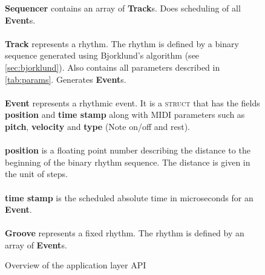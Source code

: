 \begin{figure}[H]
    \centering
    \begin{factbox}
        \textbf{Sequencer} contains an array of   \textbf{Track}s. Does scheduling of all \textbf{Event}s.
        \\\\
        \textbf{Track} represents a rhythm. The rhythm is defined by a binary sequence generated using Bjorklund's algorithm (see \cref{sec:bjorklund}). Also contains all parameters described in \cref{tab:params}. Generates \textbf{Event}s.
        \\\\
        \textbf{Event} represents a rhythmic event. It is a \textsc{struct} that has the fields \textbf{position} and \textbf{time stamp} along with MIDI parameters such as \textbf{pitch}, \textbf{velocity} and \textbf{type} (Note on/off and rest).
        \\\\
        \textbf{position} is a floating point number describing the distance to the beginning of the binary rhythm sequence. The distance is given in the unit of steps.
        \\\\
        \textbf{time stamp} is the scheduled absolute time in microseconds for an \textbf{Event}.
        \\\\
        \textbf{Groove} represents a fixed rhythm. The rhythm is defined by an array of \textbf{Event}s.
    \end{factbox}
    \caption{Overview of the application layer API}
    \label{fig:torsoapi}
\end{figure}

